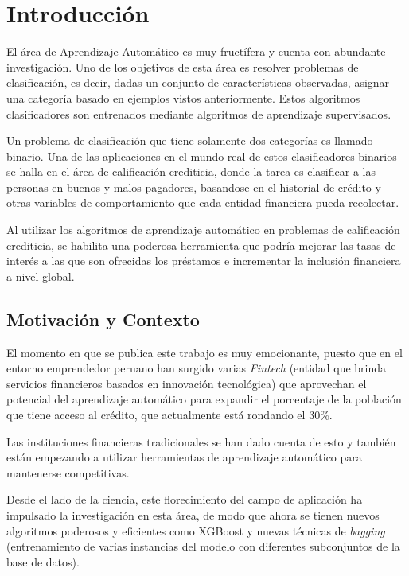 \chapter{Introducción}

El área de Aprendizaje Automático es muy fructífera y cuenta con abundante investigación. Uno de los objetivos de esta área es resolver problemas de clasificación, es decir, dadas un conjunto de características observadas, asignar una categoría basado en ejemplos vistos anteriormente. Estos algoritmos clasificadores son entrenados mediante algoritmos de aprendizaje supervisados.

Un problema de clasificación que tiene solamente dos categorías es llamado binario. Una de las aplicaciones en el mundo real de estos clasificadores binarios se halla en el área de calificación crediticia, donde la tarea es clasificar a las personas en buenos y malos pagadores, basandose en el historial de crédito y otras variables de comportamiento que cada entidad financiera pueda recolectar.

Al utilizar los algoritmos de aprendizaje automático en problemas de calificación crediticia, se habilita una poderosa herramienta que podría mejorar las tasas de interés a las que son ofrecidas los préstamos e incrementar la inclusión financiera a nivel global.

\section{Motivación y Contexto}

El momento en que se publica este trabajo es muy emocionante, puesto que en el entorno emprendedor peruano han surgido varias \textit{Fintech} (entidad que brinda servicios financieros basados en innovación tecnológica) que aprovechan el potencial del aprendizaje automático para expandir el porcentaje de la población que tiene acceso al crédito, que actualmente está rondando el 30\%.

Las instituciones financieras tradicionales se han dado cuenta de esto y también están empezando a utilizar herramientas de aprendizaje automático para mantenerse competitivas.

Desde el lado de la ciencia, este florecimiento del campo de aplicación ha impulsado la investigación en esta área, de modo que ahora se tienen nuevos algoritmos poderosos y eficientes como \ac{XGBoost} \citep{Chen:2016:XST:2939672.2939785} y nuevas técnicas de \textit{bagging} (entrenamiento de varias instancias del modelo con diferentes subconjuntos de la base de datos).

